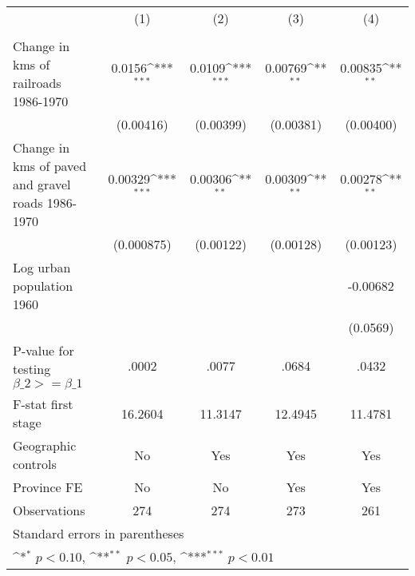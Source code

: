 {
\def\sym#1{\ifmmode^{#1}\else\(^{#1}\)\fi}
\begin{tabular}{l*{4}{c}}
\hline\hline
                &\multicolumn{1}{c}{(1)}&\multicolumn{1}{c}{(2)}&\multicolumn{1}{c}{(3)}&\multicolumn{1}{c}{(4)}\\
                &\multicolumn{1}{c}{}&\multicolumn{1}{c}{}&\multicolumn{1}{c}{}&\multicolumn{1}{c}{}\\
\hline
Change in kms of railroads 1986-1970&   0.0156\sym{***}&   0.0109\sym{***}&  0.00769\sym{**} &  0.00835\sym{**} \\
                &(0.00416)         &(0.00399)         &(0.00381)         &(0.00400)         \\
[1em]
Change in kms of paved and gravel roads 1986-1970&  0.00329\sym{***}&  0.00306\sym{**} &  0.00309\sym{**} &  0.00278\sym{**} \\
                &(0.000875)         &(0.00122)         &(0.00128)         &(0.00123)         \\
[1em]
Log urban population 1960&                  &                  &                  & -0.00682         \\
                &                  &                  &                  & (0.0569)         \\
\hline
P-value for testing $\beta\_{2} >= \beta\_{1}$&    .0002         &    .0077         &    .0684         &    .0432         \\
F-stat first stage&  16.2604         &  11.3147         &  12.4945         &  11.4781         \\
Geographic controls&       No         &      Yes         &      Yes         &      Yes         \\
Province FE     &       No         &       No         &      Yes         &      Yes         \\
Observations    &      274         &      274         &      273         &      261         \\
\hline\hline
\multicolumn{5}{l}{\footnotesize Standard errors in parentheses}\\
\multicolumn{5}{l}{\footnotesize \sym{*} \(p<0.10\), \sym{**} \(p<0.05\), \sym{***} \(p<0.01\)}\\
\end{tabular}
}
